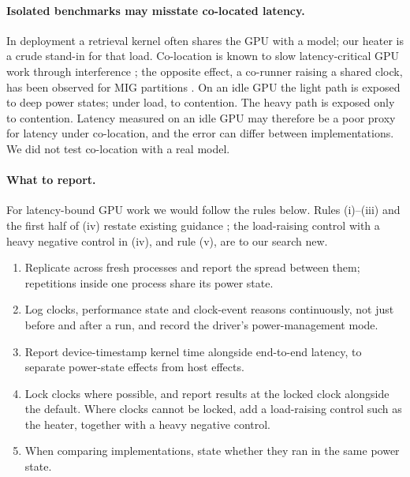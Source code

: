 \paragraph{Isolated benchmarks may misstate co-located latency.} In deployment a retrieval kernel often shares the GPU with a model; our heater is a crude stand-in for that load. Co-location is known to slow latency-critical GPU work through interference \citep{han2022reef,strati2024orion}; the opposite effect, a co-runner raising a shared clock, has been observed for MIG partitions \citep{patel2023cloudgpu}. On an idle GPU the light path is exposed to deep power states; under load, to contention. The heavy path is exposed only to contention. Latency measured on an idle GPU may therefore be a poor proxy for latency under co-location, and the error can differ between implementations. We did not test co-location with a real model.

\paragraph{What to report.} For latency-bound GPU work we would follow the rules below. Rules (i)--(iii) and the first half of (iv) restate existing guidance \citep{kalibera2013rigorous,hoefler2015scientific,nvidia_tensorrt_env,nvidia_nvbench,nvidia_ncu}; the load-raising control with a heavy negative control in (iv), and rule (v), are to our search new.
\begin{enumerate}
\item[(i)] Replicate across fresh processes and report the spread between them; repetitions inside one process share its power state.
\item[(ii)] Log clocks, performance state and clock-event reasons continuously, not just before and after a run, and record the driver's power-management mode.
\item[(iii)] Report device-timestamp kernel time alongside end-to-end latency, to separate power-state effects from host effects.
\item[(iv)] Lock clocks where possible, and report results at the locked clock alongside the default. Where clocks cannot be locked, add a load-raising control such as the heater, together with a heavy negative control.
\item[(v)] When comparing implementations, state whether they ran in the same power state.
\end{enumerate}
